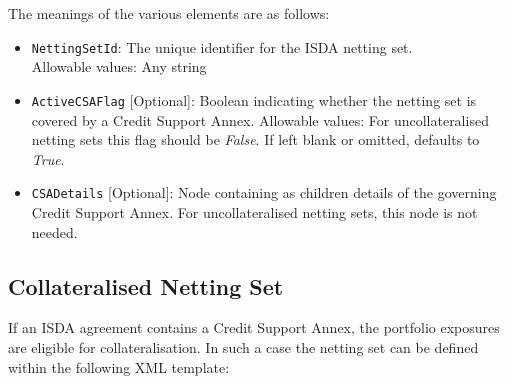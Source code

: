 The meanings of the various elements are as follows:
\begin{itemize}
\item \lstinline!NettingSetId!: The unique identifier for the ISDA netting set.
\ifdefined{}\fi \\
Allowable values: Any string
\item \lstinline!ActiveCSAFlag! [Optional]: Boolean indicating whether the netting set is
  covered by a Credit Support Annex. 
  Allowable values: For uncollateralised netting sets
  this flag should be \emph{False}. If left blank or omitted, defaults to \emph{True}.
\item \lstinline!CSADetails! [Optional]: Node containing as children details of the governing
  Credit Support Annex. For uncollateralised netting sets, this node is not needed.
\end{itemize}
\subsection{Collateralised Netting Set}
If an ISDA agreement contains a Credit Support Annex, the
portfolio exposures are eligible for collateralisation. In such a
case the netting set can be defined within the following XML template:

